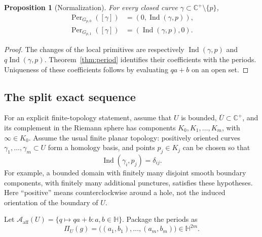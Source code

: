 \documentclass[11pt,a4paper]{article}
\numberwithin{equation}{section}
\newtheorem{proposition}[theorem]{Proposition}
\theoremstyle{definition}
\theoremstyle{remark}
\newcommand{\C}{\mathbb C}
\newcommand{\HH}{\mathbb H}
\newcommand{\Aff}{\mathcal{A}_{\mathrm{aff}}}
\newcommand{\Per}{\operatorname{Per}}
\newcommand{\Ind}{\operatorname{Ind}}
\begin{document}
\begin{proposition}[Normalization]\label{prop:normalization}
For every closed curve $\gamma\subset\C^+\setminus\{p\}$,
\begin{align}
 \Per_{G_{p,0}}([\gamma])&=(0,\Ind(\gamma,p)),\\
 \Per_{G_{p,1}}([\gamma])&=(\Ind(\gamma,p),0).
 \label{eq:normalized-periods}
\end{align}
\end{proposition}
\begin{proof}
The changes of the local primitives are respectively
$\Ind(\gamma,p)$ and $q\Ind(\gamma,p)$.
Theorem~\ref{thm:period} identifies their coefficients with the periods.
Uniqueness of these coefficients follows by evaluating $qa+b$ on an open set.
\end{proof}

\subsection{The split exact sequence}
For an explicit finite-topology statement, assume that $U$ is bounded,
$\overline U\subset\C^+$, and its complement in the Riemann sphere has
components $K_0,K_1,\ldots,K_m$, with $\infty\in K_0$.
Assume the usual finite planar topology: positively oriented curves
$\gamma_1,\ldots,\gamma_m\subset U$ form a homology basis, and points
$p_j\in K_j$ can be chosen so that
\begin{equation}
 \Ind(\gamma_i,p_j)=\delta_{ij}.
 \label{eq:winding-basis}
\end{equation}
For example, a bounded domain with finitely many disjoint smooth boundary
components, with finitely many additional punctures, satisfies these
hypotheses. Here ``positive'' means counterclockwise around a hole, not the
induced orientation of the boundary of $U$.

Let $\Aff(U)=\{q\mapsto qa+b:a,b\in\HH\}$. Package the periods as
\[
 \Pi_U(g)=\bigl((a_1,b_1),\ldots,(a_m,b_m)\bigr)\in\HH^{2m}.
\]
\end{document}
